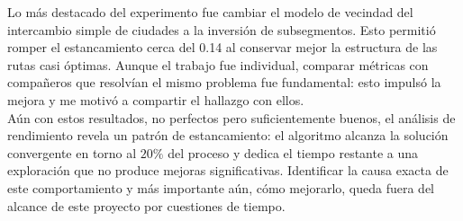 \documentclass[9pt,a4paper,twocolumn,twoside]{rho-class/rho}
\begin{document}
Lo más destacado del experimento fue cambiar el modelo de vecindad del intercambio simple de ciudades a
la inversión de subsegmentos. Esto permitió romper el estancamiento cerca del 0.14 al conservar mejor la
estructura de las rutas casi óptimas. Aunque el trabajo fue individual, comparar métricas con compañeros
que resolvían el mismo problema fue fundamental: esto impulsó la mejora y me motivó a compartir el
hallazgo con ellos. \\

Aún con estos resultados, no perfectos pero suficientemente buenos, el análisis de rendimiento revela 
un patrón de estancamiento: el algoritmo alcanza la solución 
convergente en torno al \(20\%\) del proceso y dedica el tiempo restante a una exploración que 
no produce mejoras significativas. Identificar la causa exacta de este comportamiento y más importante
aún, cómo mejorarlo, queda fuera del alcance de este proyecto por cuestiones de tiempo. %


\printbibliography
\end{document}
